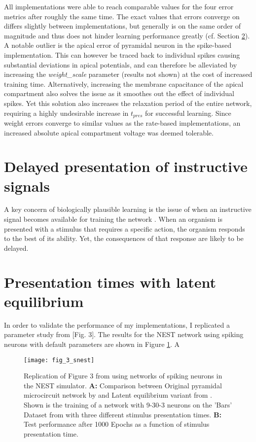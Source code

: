 All implementations were able to reach comparable values for the four error metrics after roughly the same time. The
exact values that errors converge on differs slightly between implementations, but generally is on the same order of
magnitude and thus does not hinder learning performance greatly (cf. Section \ref{sec-le-tpres}). A notable outlier is
the apical error of pyramidal neuron in the spike-based implementation. This can however be traced back to individual
spikes causing substantial deviations in apical potentials, and can therefore be alleviated by increasing the
\textit{weight\_scale} parameter (results not shown) at the cost of increased training time. Alternatively, increasing
the membrane capacitance of the apical compartment also solves the issue as it smoothes out the effect of individual
spikes. Yet this solution also increases the relaxation period of the entire network, requiring a highly
undesirable increase in $t_{pres}$ for successful learning. Since weight errors converge to similar values as the
rate-based implementations, an increased absolute apical compartment voltage was deemed tolerable.

\section{Delayed presentation of instructive signals}

A key concern of biologically plausible learning is the issue of when an instructive signal becomes available for
training the network . When an organism is presented with a stimulus that requires a specific action,
the organism responds to the best of its ability. Yet, the consequences of that response are likely to be delayed.


\section{Presentation times with latent equilibrium}\label{sec-le-tpres}

In order to validate the performance of my implementations, I replicated a parameter study from \cite{Haider2021}[Fig.
    3]. The results for the NEST network using spiking neurons with default parameters  are
shown in Figure \ref{fig-bars-le-snest}. A



\begin{figure}[t]
    \centering
    \texttt{[image: fig\_3\_snest]}
    \caption{Replication of Figure 3 from \cite{Haider2021} using networks of spiking neurons in the NEST simulator.
        \textbf{A:} Comparison between Original pyramidal microcircuit network by \cite{sacramento2018dendritic} and
        Latent equilibrium variant from \cite{Haider2021}. Shown is the training of a network with 9-30-3 neurons on the
        'Bars' Dataset from  with three different stimulus presentation times. \textbf{B:} Test
        performance after 1000 Epochs as a function of stimulus presentation time.}
    \label{fig-bars-le-snest}
\end{figure}


